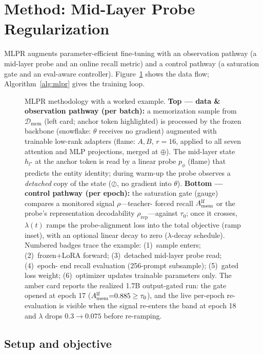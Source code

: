 \section{Method: Mid-Layer Probe Regularization}
\label{sec:method}

MLPR augments parameter-efficient fine-tuning with an observation pathway
(a mid-layer probe and an online recall metric) and a control pathway (a
saturation gate and an eval-aware controller). Figure~\ref{fig:method}
shows the data flow; Algorithm~\ref{alg:mlpr} gives the training loop.

\begin{figure}[t]
\centering
\resizebox{0.985\textwidth}{!}{%
}
\caption{MLPR methodology with a worked example.
\textbf{Top --- data \& observation pathway (per batch):} a memorization
sample from $\mathcal{D}_{\mathrm{mem}}$ (left card; anchor token
highlighted) is processed by the frozen backbone (snowflake: $\theta$
receives no gradient) augmented with trainable low-rank adapters
(flame: $A,B$, $r{=}16$, applied to all seven attention and MLP
projections, merged at $\oplus$). The mid-layer state $h_{l^\star}$ at
the anchor token is read by a linear probe $p_\phi$ (flame) that
predicts the entity identity; during warm-up the probe observes a
\emph{detached} copy of the state ($\oslash$, no gradient into
$\theta$). \textbf{Bottom --- control pathway (per epoch):} the
saturation gate (gauge) compares a monitored signal $\rho$---teacher-
forced recall $A_{\mathrm{mem}}^{\mathrm{lf}}$ or the probe's representation decodability
$\rho_{\mathrm{rep}}$---against $\tau_0$; once it crosses,
$\lambda(t)$ ramps the probe-alignment loss into the total objective
(ramp inset), with an optional linear decay to zero ($\lambda$-decay
schedule). Numbered badges trace the example: (1)~sample enters;
(2)~frozen+LoRA forward; (3)~detached mid-layer probe read; (4)~epoch-
end recall evaluation (256-prompt subsample); (5)~gated loss weight;
(6)~optimizer updates trainable parameters only. The amber card
reports the realized 1.7B output-gated run: the gate opened at epoch 17
($A_{\mathrm{mem}}^{\mathrm{lf}}{=}0.885\ge\tau_0$), and the live per-epoch re-evaluation is
visible when the signal re-enters the band at epoch 18 and $\lambda$
drops $0.3\!\to\!0.075$ before re-ramping.}
\label{fig:method}
\end{figure}

\subsection{Setup and objective}
\label{sec:method:setup}

